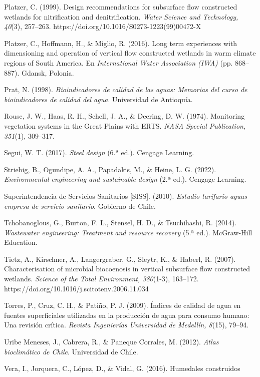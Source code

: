\documentclass[12pt, letterpaper]{report}
\begin{document}
Platzer, C. (1999). Design recommendations for subsurface flow constructed wetlands for nitrification and denitrification. \textit{Water Science and Technology, 40}(3), 257--263. https://doi.org/10.1016/S0273-1223(99)00472-X

Platzer, C., Hoffmann, H., \& Miglio, R. (2016). Long term experiences with dimensioning and operation of vertical flow constructed wetlands in warm climate regions of South America. En \textit{International Water Association (IWA)} (pp. 868--887). Gdansk, Polonia.

Prat, N. (1998). \textit{Bioindicadores de calidad de las aguas: Memorias del curso de bioindicadores de calidad del agua}. Universidad de Antioquía.

Rouse, J. W., Haas, R. H., Schell, J. A., \& Deering, D. W. (1974). Monitoring vegetation systems in the Great Plains with ERTS. \textit{NASA Special Publication, 351}(1), 309--317.

Segui, W. T. (2017). \textit{Steel design} (6.ª ed.). Cengage Learning.

Striebig, B., Ogundipe, A. A., Papadakis, M., \& Heine, L. G. (2022). \textit{Environmental engineering and sustainable design} (2.ª ed.). Cengage Learning.

Superintendencia de Servicios Sanitarios [SISS]. (2010). \textit{Estudio tarifario aguas empresa de servicio sanitario}. Gobierno de Chile.

Tchobanoglous, G., Burton, F. L., Stensel, H. D., \& Tsuchihashi, R. (2014). \textit{Wastewater engineering: Treatment and resource recovery} (5.ª ed.). McGraw-Hill Education.

Tietz, A., Kirschner, A., Langergraber, G., Sleytr, K., \& Haberl, R. (2007). Characterisation of microbial biocoenosis in vertical subsurface flow constructed wetlands. \textit{Science of the Total Environment, 380}(1-3), 163--172. https://doi.org/10.1016/j.scitotenv.2006.11.034

Torres, P., Cruz, C. H., \& Patiño, P. J. (2009). Índices de calidad de agua en fuentes superficiales utilizadas en la producción de agua para consumo humano: Una revisión crítica. \textit{Revista Ingenierías Universidad de Medellín, 8}(15), 79--94.

Uribe Meneses, J., Cabrera, R., \& Paneque Corrales, M. (2012). \textit{Atlas bioclimático de Chile}. Universidad de Chile.

Vera, I., Jorquera, C., López, D., \& Vidal, G. (2016). Humedales construidos


\end{document}
